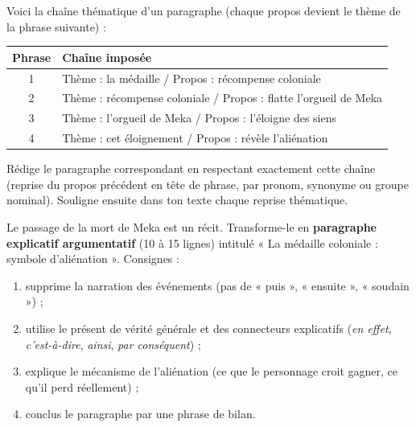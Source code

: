 \documentclass[11pt]{article}
\newcounter{popsec}
\newcounter{popsub}
\newcommand{\courssub}[1]{%
  \stepcounter{popsub}%
  \par\vspace{9pt}\noindent{\popxbold\fontsize{11.5}{13}\selectfont\color{popink}{\color{poporange}\thepopsec.\thepopsub}\hspace{6pt}#1}\par\nopagebreak\vspace{4pt}
}
\begin{document}
\begin{exercice}
Voici la chaîne thématique d'un paragraphe (chaque propos devient le thème de la phrase suivante) :

\begin{center}
\begin{tabularx}{\linewidth}{|c|X|}\hline
\rowcolor{popblueL} Phrase & Chaîne imposée \\ \hline
1 & Thème : la médaille / Propos : récompense coloniale \\ \hline
2 & Thème : récompense coloniale / Propos : flatte l'orgueil de Meka \\ \hline
3 & Thème : l'orgueil de Meka / Propos : l'éloigne des siens \\ \hline
4 & Thème : cet éloignement / Propos : révèle l'aliénation \\ \hline
\end{tabularx}
\end{center}

Rédige le paragraphe correspondant en respectant exactement cette chaîne (reprise du propos précédent en tête de phrase, par pronom, synonyme ou groupe nominal). Souligne ensuite dans ton texte chaque reprise thématique.
\end{exercice}

\begin{exercice}
Le passage de la mort de Meka est un récit. Transforme-le en \textbf{paragraphe explicatif argumentatif} (10 à 15 lignes) intitulé « La médaille coloniale : symbole d'aliénation ». Consignes :
\begin{enumerate}
\item supprime la narration des événements (pas de « puis », « ensuite », « soudain ») ;
\item utilise le présent de vérité générale et des connecteurs explicatifs (\emph{en effet}, \emph{c'est-à-dire}, \emph{ainsi}, \emph{par conséquent}) ;
\item explique le mécanisme de l'aliénation (ce que le personnage croit gagner, ce qu'il perd réellement) ;
\item conclus le paragraphe par une phrase de bilan.
\end{enumerate}
\end{exercice}

\courssub{Je me prépare au Bac}
\end{document}
